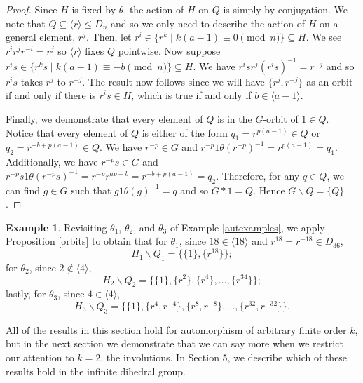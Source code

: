 \documentclass[12pt]{amsart}
\numberwithin{equation}{section}
\theoremstyle{definition}
\newtheorem{example}[theorem]{Example}
\begin{document}
\begin{proof}
Since $H$ is fixed by $\theta$, the action of $H$ on $Q$ is simply by conjugation. We note that $Q\subseteq \langle r\rangle\leq D_n$ 
and so we only need to describe the action of $H$ on a general element, $r^j$. Then, let $r^i\in\{r^k\mid k(a-1)\equiv 0 \pmod{n}\}
\subseteq H$. We see $r^ir^jr^{-i}=r^j$ so $\langle r\rangle$ fixes $Q$ pointwise. Now suppose $r^is\in\{r^ks\mid k(a-1)\equiv -b
\pmod{n}\}\subseteq H$. We have $r^isr^j(r^is)^{-1}=r^{-j}$ and so $r^is$ takes $r^j$ to $r^{-j}$. The result now follows since we 
will have $\{r^j,r^{-j}\}$ as an orbit if and only if there is $r^is\in H$, which is true if and only if $b\in\langle a-1\rangle$.

Finally, we demonstrate that every element of $Q$ is in the $G$-orbit of $1\in Q$. Notice that every element of $Q$ is either of the 
form $q_1=r^{p(a-1)}\in Q$ or $q_2=r^{-b+p(a-1)}\in Q$. We have $r^{-p}\in G$ and $r^{-p}1\theta(r^{-p})^{-1}=r^{p(a-1)}=q_1$. 
Additionally, we have $r^{-p}s\in G$ and $r^{-p}s1\theta(r^{-p}s)^{-1}=r^{-p}r^{ap-b}=r^{-b+p(a-1)}=q_2$. Therefore, for any $q\in Q
$, we can find $g\in G$ such that $g1\theta(g)^{-1}=q$ and so $G*1=Q$. Hence $G\backslash Q=\{Q\}$.
\end{proof}

\begin{example}
Revisiting $\theta_1$, $\theta_2$, and $\theta_3$ of Example \ref{autexamples}, we apply Proposition \ref{orbits} to obtain that for 
$\theta_1$, since $18\in \langle 18\rangle$ and $r^{18} = r^{-18} \in D_{36}$, $$H_1\backslash Q_1=\{\{1\},\{r^{18}\}\};$$ for $
\theta_2$, since $2\not\in\langle 4\rangle$, $$H_2\backslash Q_2=\{\{1\},\{r^2\},\{r^4\},\ldots,\{r^{34}\}\};$$ lastly, for $
\theta_3$, since $4\in\langle 4\rangle$, $$H_3\backslash Q_3 = \{\{1\}, \{r^4,r^{-4}\}, \{r^8,r^{-8}\}, \ldots, \{r^{32},r^{-32}\}\}.
$$
\end{example}


All of the results in this section hold for automorphism of arbitrary finite order $k$, but in the next section we demonstrate that 
we can say more when we restrict our attention to $k=2$, the involutions. In Section 5, we describe which of these results hold in 
the infinite dihedral group.
\end{document}
